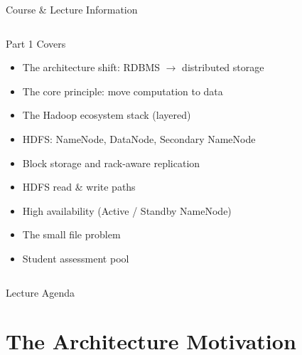 \documentclass[aspectratio=169,10pt]{beamer}
\begin{document}
\begin{frame}{Course \& Lecture Information}
\begin{columns}[T]
      \begin{exampleblock}{Part 1 Covers}
        \begin{itemize}
          \item The architecture shift: RDBMS $\to$ distributed storage
          \item The core principle: move computation to data
          \item The Hadoop ecosystem stack (layered)
          \item HDFS: NameNode, DataNode, Secondary NameNode
          \item Block storage and rack-aware replication
          \item HDFS read \& write paths
          \item High availability (Active / Standby NameNode)
          \item The small file problem
          \item Student assessment pool
        \end{itemize}
      \end{exampleblock}
  \end{columns}
\end{frame}

\begin{frame}{Lecture Agenda}
  \tableofcontents
\end{frame}

\section{The Architecture Motivation}
\end{document}
